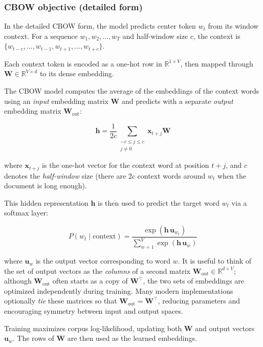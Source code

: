 \subsubsection{CBOW objective (detailed form)}
\label{sec:nlp_continuous_bag_of_words_cbow_sub_2}

In the detailed CBOW form, the model predicts center token \(w_t\) from its window context. For a sequence \( w_1, w_2, \ldots, w_T \) and half-window size \( c \), the context is \( \{ w_{t-c}, \ldots, w_{t-1}, w_{t+1}, \ldots, w_{t+c} \} \).

Each context token is encoded as a one-hot row in \(\mathbb{R}^{1\times V}\), then mapped through \(\mathbf{W}\in\mathbb{R}^{V\times d}\) to its dense embedding.

The CBOW model computes the average of the embeddings of the context words using an \emph{input} embedding matrix \(\mathbf{W}\) and predicts with a separate \emph{output} embedding matrix \(\mathbf{W}_{\text{out}}\):

\[
\mathbf{h} = \frac{1}{2c} \sum_{\substack{-c \leq j \leq c \\ j \neq 0}} \mathbf{x}_{t+j}\mathbf{W}
\]

where \( \mathbf{x}_{t+j} \) is the one-hot vector for the context word at position \( t+j \), and \(c\) denotes the \emph{half-window} size (there are \(2c\) context words around \(w_t\) when the document is long enough).

This hidden representation \( \mathbf{h} \) is then used to predict the target word \( w_t \) via a softmax layer:

\begin{equation}
P(w_t \mid \text{context}) = \frac{\exp(\mathbf{h}\,\mathbf{u}_{w_t})}{\sum_{w=1}^V \exp(\mathbf{h}\,\mathbf{u}_w)}
\label{eq:cbow-softmax}
\end{equation}

where \( \mathbf{u}_w \) is the output vector corresponding to word \( w \).
It is useful to think of the set of output vectors as the \emph{columns} of a second matrix \(\mathbf{W}_{\text{out}} \in \mathbb{R}^{d \times V}\); although \(\mathbf{W}_{\text{out}}\) often starts as a copy of \(\mathbf{W}^\top\), the two sets of embeddings are optimized independently during training. Many modern implementations optionally \emph{tie} these matrices so that \(\mathbf{W}_{\text{out}}=\mathbf{W}^\top\), reducing parameters and encouraging symmetry between input and output spaces.

Training maximizes corpus log-likelihood, updating both \(\mathbf{W}\) and output vectors \(\mathbf{u}_w\). The rows of \(\mathbf{W}\) are then used as the learned embeddings.

